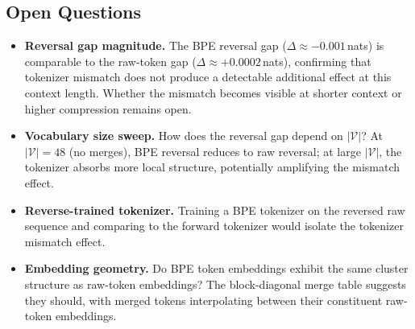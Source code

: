 \documentclass[11pt]{article}
\begin{document}
\subsection{Open Questions}

\begin{itemize}
\item \textbf{Reversal gap magnitude.}  The BPE reversal gap ($\Delta \approx -0.001$\,nats) is comparable to the raw-token gap ($\Delta \approx +0.0002$\,nats), confirming that tokenizer mismatch does not produce a detectable additional effect at this context length.  Whether the mismatch becomes visible at shorter context or higher compression remains open.
\item \textbf{Vocabulary size sweep.}  How does the reversal gap depend on $|\mathcal{V}|$?  At $|\mathcal{V}| = 48$ (no merges), BPE reversal reduces to raw reversal; at large $|\mathcal{V}|$, the tokenizer absorbs more local structure, potentially amplifying the mismatch effect.
\item \textbf{Reverse-trained tokenizer.}  Training a BPE tokenizer on the reversed raw sequence and comparing to the forward tokenizer would isolate the tokenizer mismatch effect.
\item \textbf{Embedding geometry.}  Do BPE token embeddings exhibit the same cluster structure as raw-token embeddings?  The block-diagonal merge table suggests they should, with merged tokens interpolating between their constituent raw-token embeddings.
\end{itemize}
\end{document}
